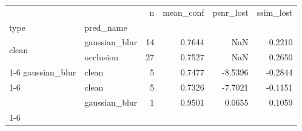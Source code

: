 \begin{tabular}{llrrrr}
\toprule
 &  & n & mean_conf & psnr_lost & ssim_lost \\
type & pred_name &  &  &  &  \\
\midrule
\multirow[t]{2}{*}{clean} & gaussian_blur & 14 & 0.7644 & NaN & 0.2210 \\
 & occlusion & 27 & 0.7527 & NaN & 0.2650 \\
\cline{1-6}
gaussian_blur & clean & 5 & 0.7477 & -8.5396 & -0.2844 \\
\cline{1-6}
\multirow[t]{2}{*}{occlusion} & clean & 5 & 0.7326 & -7.7021 & -0.1151 \\
 & gaussian_blur & 1 & 0.9501 & 0.0655 & 0.1059 \\
\cline{1-6}
\bottomrule
\end{tabular}
